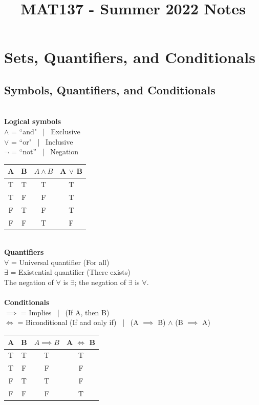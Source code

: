 \documentclass{article}
\title{MAT137 - Summer 2022 Notes}
\author{}
\date{}
\begin{document}
\maketitle

\tableofcontents

\newpage
\section{Sets, Quantifiers, and Conditionals}
\subsection{Symbols, Quantifiers, and Conditionals}
\\
\textbf{Logical symbols}\\
$\land$ = ``and" \ |  \ Exclusive\\
$\lor$ = ``or" \ | \ Inclusive\\
$\neg$ = ``not'' \ | \ Negation
\begin{center}
\begin{tabular}{ c|c|c|c } 
 A & B & $ A \land B$ & A $\lor$ B\\
 \hline
 T & T & T & T \\ 
 T & F & F & T\\
 F & T & F & T \\
 F & F & T & F\\
\end{tabular}
\end{center}
\\ \textbf{Quantifiers}\\
$\forall$ = Universal quantifier (For all)\\
$\exists$ = Existential quantifier (There exists)\\
The negation of $\forall$ is $\exists$; the negation of $\exists$ is $\forall$.\\
\\
\textbf{Conditionals}\\
$\implies$ = Implies \ | \ (If A, then B)\\
$\iff$ = Biconditional (If and only if) \ | \ (A $\implies$ B) $\land$ (B $\implies$ A)
\begin{center}
\begin{tabular}{ c|c|c|c } 
 A & B & $ A \implies B$ & A $\iff$ B\\
 \hline
 T & T & T & T \\ 
 T & F & F & F\\
 F & T & T & F \\
 F & F & F & T\\
\end{tabular}
\end{center}
\end{document}
